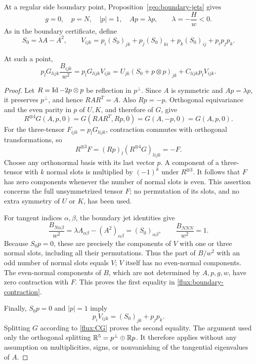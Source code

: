 At a regular side boundary point, Proposition~\ref{geo:boundary-jets} gives
\[
 g=0,\quad p=N,\quad |p|=1,\quad Ap=\lambda p,
 \qquad \lambda=-\frac H w<0.
\]
As in the boundary certificate, define
\begin{equation}\label{flux:boundary-model}
 S_0=\lambda A-A^2,\qquad
 V_{ijk}=p_i(S_0)_{jk}+p_j(S_0)_{ki}+p_k(S_0)_{ij}
          +p_ip_jp_k.
\end{equation}

\begin{lemma}\label{flux:boundary-parity}
At such a point,
\begin{equation}\label{flux:boundary-contraction}
 p_lG_{lijk}\frac{B_{ijk}}{w^2}
 =p_lG_{lijk}V_{ijk}
 =U_{jk}(S_0+p\otimes p)_{jk}+C_{lijk}p_lV_{ijk}.
\end{equation}
\end{lemma}

\begin{proof}
Let $R=\operatorname{Id}-2p\otimes p$ be reflection in $p^\perp$.  Since $A$ is
symmetric and $Ap=\lambda p$, it preserves $p^\perp$, and hence
$RAR^T=A$.  Also $Rp=-p$.  Orthogonal equivariance and the even parity
in $p$ of $U,K$, and therefore of $G$, give
\[
 R^{\otimes4}G(A,p,0)=G(RAR^T,Rp,0)
                   =G(A,-p,0)=G(A,p,0).
\]
For the three-tensor $F_{ijk}=p_lG_{lijk}$, contraction commutes with
orthogonal transformations, so
\[
 R^{\otimes3}F=(Rp)_l(R^{\otimes4}G)_{lijk}=-F.
\]
Choose any orthonormal basis with its last vector $p$.  A component of a
three-tensor with $k$ normal slots is multiplied by $(-1)^k$ under
$R^{\otimes3}$.  It follows that $F$ has zero components whenever the
number of normal slots is even.  This assertion concerns the full
unsymmetrized tensor $F$; no permutation of its slots, and no extra
symmetry of $U$ or $K$, has been used.

For tangent indices $\alpha,\beta$, the boundary jet identities give
\[
 \frac{B_{N\alpha\beta}}{w^2}
 =\lambda A_{\alpha\beta}-(A^2)_{\alpha\beta}
 =(S_0)_{\alpha\beta},\qquad
 \frac{B_{NNN}}{w^2}=1.
\]
Because $S_0p=0$, these are precisely the components of $V$ with one or
three normal slots, including all their permutations.  Thus the part
of $B/w^2$ with an odd number of normal slots equals $V$; $V$ itself
has no even-normal components.  The even-normal components of $B$,
which are not determined by $A,p,g,w$, have
zero contraction with $F$.  This proves the first equality in
\eqref{flux:boundary-contraction}.

Finally, $S_0p=0$ and $|p|=1$ imply
\[
 p_iV_{ijk}=(S_0)_{jk}+p_jp_k.
\]
Splitting $G$ according to \eqref{flux:CG} proves the second equality.
The argument used only the orthogonal splitting
$\mathbb R^5=p^\perp\oplus\mathbb R p$.  It therefore applies without any assumption
on multiplicities, signs, or nonvanishing of the tangential eigenvalues
of $A$.
\end{proof}

